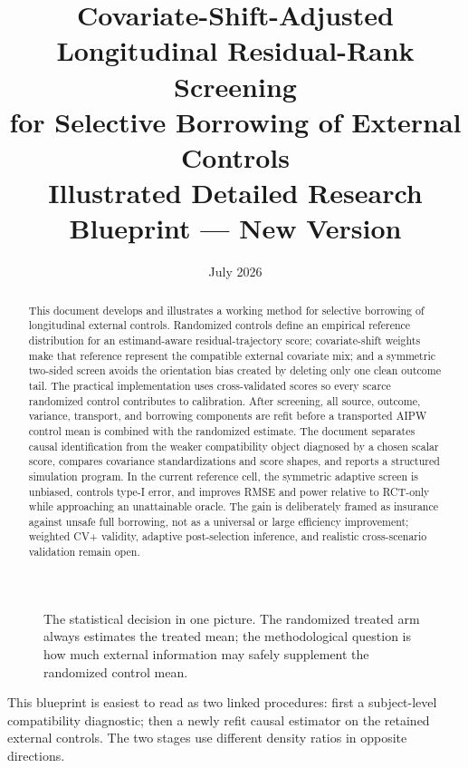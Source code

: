 \documentclass[11pt]{article}
\title{\textbf{Covariate-Shift-Adjusted Longitudinal Residual-Rank Screening\\for Selective Borrowing of External Controls}\\[0.5em]
\large Illustrated Detailed Research Blueprint --- New Version}
\author{}
\date{July 2026}
\newcommand{\fullfig}[1]{\resizebox{\linewidth}{!}{}}
\begin{document}
\maketitle

\pagestyle{fancy}
\fancyhf{}
\fancyhead[L]{\small\textcolor{midgray}{Longitudinal residual-rank screening}}
\fancyhead[R]{\small\textcolor{midgray}{Illustrated detailed blueprint}}
\fancyfoot[C]{\textcolor{midgray}{\thepage}}
\renewcommand{\headrulewidth}{0.3pt}

\begin{abstract}
This document develops and illustrates a working method for selective borrowing of longitudinal external controls. Randomized controls define an empirical reference distribution for an estimand-aware residual-trajectory score; covariate-shift weights make that reference represent the compatible external covariate mix; and a symmetric two-sided screen avoids the orientation bias created by deleting only one clean outcome tail. The practical implementation uses cross-validated scores so every scarce randomized control contributes to calibration. After screening, all source, outcome, variance, transport, and borrowing components are refit before a transported AIPW control mean is combined with the randomized estimate. The document separates causal identification from the weaker compatibility object diagnosed by a chosen scalar score, compares covariance standardizations and score shapes, and reports a structured simulation program. In the current reference cell, the symmetric adaptive screen is unbiased, controls type-I error, and improves RMSE and power relative to RCT-only while approaching an unattainable oracle. The gain is deliberately framed as insurance against unsafe full borrowing, not as a universal or large efficiency improvement; weighted CV+ validity, adaptive post-selection inference, and realistic cross-scenario validation remain open.
\end{abstract}

\begin{figure}[!ht]
\centering
\fullfig{problem_landscape.tex}
\caption{The statistical decision in one picture. The randomized treated arm always estimates the treated mean; the methodological question is how much external information may safely supplement the randomized control mean.}
\label{fig:problem-landscape}
\end{figure}

\begin{takeaway}
This blueprint is easiest to read as two linked procedures: first a subject-level compatibility diagnostic; then a newly refit causal estimator on the retained external controls. The two stages use different density ratios in opposite directions.
\end{takeaway}
\end{document}
